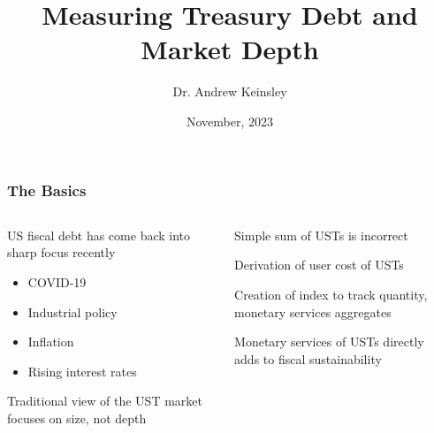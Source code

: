 \documentclass[11pt, handout, aspectratio=169]{beamer}
\title[Measuring Treasury Debt and Depth]{Measuring Treasury Debt and Market Depth}
\author[Keinsley]{Dr. Andrew Keinsley}
\institute[WSU]{Weber State University}
\date{November, 2023}
\newenvironment{wideitemize}{\itemize\addtolength{\itemsep}{10pt}}{\enditemize}
\newenvironment{wideenumerate}{\enumerate\addtolength{\itemsep}{10pt}}{\endenumerate}
\begin{document}
\frame{\maketitle}


\begin{frame}
\frametitle{The Basics}
\begin{columns}[t]
	\begin{column}{0.49\textwidth}
		\begin{wideitemize}
			\item US fiscal debt has come back into sharp focus recently
			\begin{itemize}
				\item COVID-19
				\item Industrial policy
				\item Inflation
				\item Rising interest rates
			\end{itemize}
			\item Traditional view of the UST market focuses on size, not depth 
		\end{wideitemize}	
	\end{column}
	\hfill
	\begin{column}{0.49\textwidth}
		\begin{wideitemize}
			\item {\bf \color{WeberPurple}{Contributions}}
			\begin{wideenumerate}
				\item Simple sum of USTs is incorrect
				\item Derivation of user cost of USTs
				\item Creation of index to track quantity, monetary services aggregates
				\item Monetary services of USTs directly adds to fiscal sustainability
			\end{wideenumerate}
		\end{wideitemize}
	\end{column}
\end{columns}
\end{frame}

\end{document}
